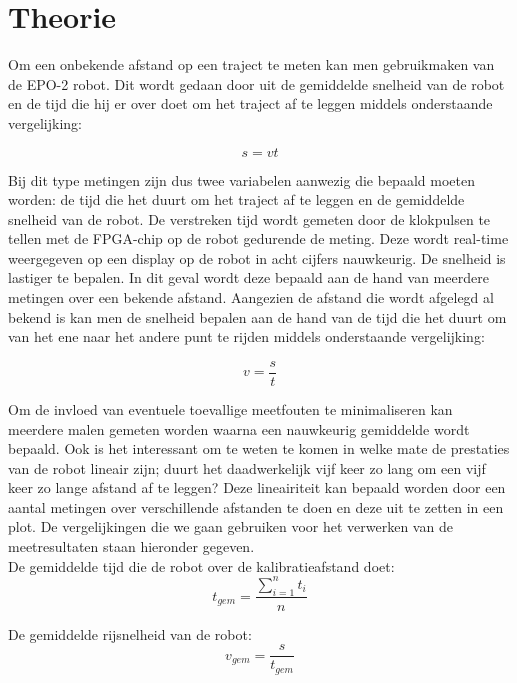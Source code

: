 \documentclass{report}
\begin{document}
\chapter{Theorie}
Om een onbekende afstand op een traject te meten kan men gebruikmaken van de EPO-2 robot. Dit wordt gedaan door uit de gemiddelde snelheid van de robot en de tijd 
die hij er over doet om het traject af te leggen middels onderstaande vergelijking:

\begin{equation}
	s = vt
\end{equation}

\noindent
Bij dit type metingen zijn dus twee variabelen aanwezig die bepaald moeten worden: de tijd die het duurt om het traject af te leggen en de gemiddelde snelheid van de robot. 
De verstreken tijd wordt gemeten door de klokpulsen te tellen met de FPGA-chip op de robot gedurende de meting. Deze wordt real-time weergegeven op een display op de robot in acht cijfers nauwkeurig.
De snelheid is lastiger te bepalen. In dit geval wordt deze bepaald aan de hand van meerdere metingen over een bekende afstand. Aangezien de afstand die wordt afgelegd al bekend is kan men de snelheid bepalen aan de hand van de tijd die het duurt om van het ene naar het andere punt te rijden middels onderstaande vergelijking:

\begin{equation}
	\label{eq:vel}
	v=\frac{s}{t}
\end{equation}

\noindent
Om de invloed van eventuele toevallige meetfouten te minimaliseren kan meerdere malen gemeten worden waarna een nauwkeurig gemiddelde wordt bepaald. Ook is het interessant om te weten te komen in welke mate de prestaties van de robot lineair zijn; duurt het daadwerkelijk vijf keer zo lang om een vijf keer zo lange afstand af te leggen? Deze lineairiteit kan bepaald worden door een aantal metingen over verschillende afstanden te doen en deze uit te zetten in een plot. De vergelijkingen die we gaan gebruiken voor het verwerken van de meetresultaten staan hieronder gegeven.\\

\noindent
De gemiddelde tijd die de robot over de kalibratieafstand doet:
\begin{equation}
\label{eq:avgTime}
	t_{gem}=\frac{\sum_{i=1}^{n}t_i}{n}
\end{equation}

\noindent
De gemiddelde rijsnelheid van de robot:
\begin{equation}
\label{eq:avgVel}
	v_{gem} = \frac{s}{t_{gem}}
\end{equation}
\end{document}
